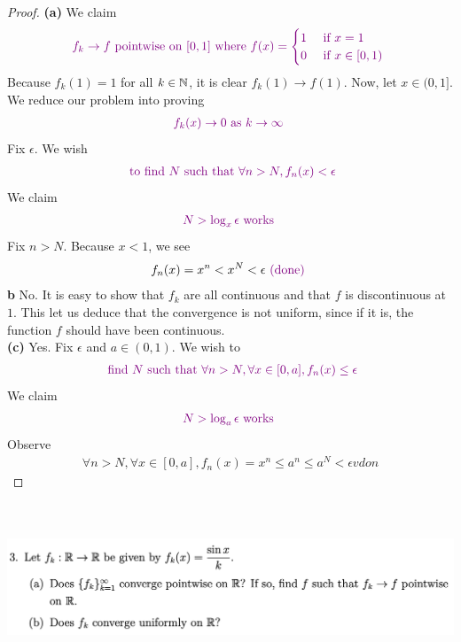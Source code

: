 \documentclass{report}
\begin{document}
\begin{proof}
\textbf{(a)} We claim 
\begin{align*}
\textcolor{violet}{f_k\to f\text{ pointwise on $[0,1]$ where }f(x)=\begin{cases}
  1& \text{ if $x=1$ }\\
  0& \text{ if $x\in [0,1)$ }
\end{cases}}
\end{align*}
Because $f_k(1)=1$ for all $k\in\mathbb{N}$, it is clear $f_k(1)\to f(1)$. Now, let $x \in (0,1]$. We reduce our problem into proving 
\begin{align*}
\textcolor{violet}{f_k(x)\to 0\text{ as $k \to \infty$ }}
\end{align*}
Fix $\epsilon $. We wish  
\begin{align*}
\textcolor{violet}{\text{ to find $N$ such that }\forall n>N, f_n(x)< \epsilon }
\end{align*}
We claim 
\begin{align*}
  \textcolor{violet}{N>\log_x \epsilon\text{ works }}
\end{align*}
Fix $n>N$. Because $x<1$,  we see 
 \begin{align*}
f_n(x)=x^n<x^N<\epsilon \textcolor{violet}{\text{ (done) }}
\end{align*}
\textbf{b}
No. It is easy to show that $f_k$ are all continuous and that $f$ is discontinuous at $1$. This let us deduce that the convergence is not uniform, since if it is, the function $f$ should have been continuous.\\

\textbf{(c)} Yes. Fix $\epsilon $ and $a \in (0,1)$. We wish to 
\begin{align*}
\textcolor{violet}{\text{ find $N$ such that }\forall n>N,\forall x \in [0,a], f_n(x)\leq \epsilon }
\end{align*}
We claim 
\begin{align*}
\textcolor{violet}{N>\log_a \epsilon \text{ works }}
\end{align*}
Observe 
\begin{align*}
\forall n >N, \forall  x\in [0,a], f_n(x)=x^n \leq a^n \leq a^N <\epsilon vdon
\end{align*}

\end{proof}
\begin{question}{}{}
\includegraphics[height=5cm,width=18cm]{HW1.5}
\end{question}
\end{document}
